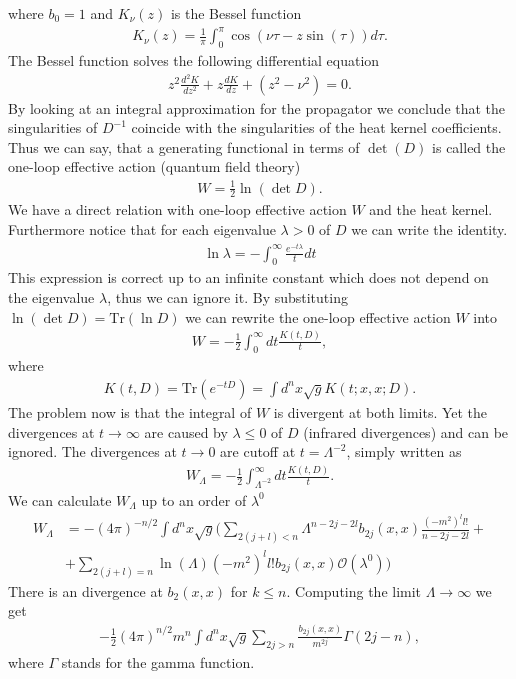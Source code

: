 where $b_0 = 1$ and $K_\nu (z)$ is the Bessel function
\begin{align}
    K_\nu(z) = \frac{1}{\pi} \int_0^\pi \cos(\nu\tau-z\sin(\tau))d\tau.
\end{align}
The Bessel function solves the following differential equation
\begin{align}
    z^2 \frac{d^2K}{dz^2} + z \frac{dK}{dz} + (z^2 - \nu^2)=0.
\end{align}
By looking at an integral approximation for the propagator we conclude that
the singularities of $D^{-1}$ coincide with the singularities of the heat
kernel coefficients. Thus we can say, that a generating functional in terms of
$\det(D)$ is called the one-loop effective action (quantum field theory)
\begin{align}
    W = \frac{1}{2}\ln(\det D).
\end{align}
We have a direct relation with one-loop effective action $W$ and the
heat kernel. Furthermore notice that for each eigenvalue $\lambda >0$ of $D$
we can write the identity.
\begin{align}
    \ln \lambda  = -\int_0^\infty \frac{e^{-t\lambda}}{t}dt
\end{align}
This expression is correct up to an infinite constant which does not depend
on the eigenvalue $\lambda$, thus we can ignore it. By substituting
$\ln(\det D) = \text{Tr}(\ln D)$ we can rewrite the one-loop effective action
$W$ into
\begin{align}
    W = -\frac{1}{2} \int_0^\infty dt \frac{K(t, D)}{t},
\end{align}
where
\begin{align}
    K(t, D) = \text{Tr}(e^{-tD}) = \int d^n x \sqrt{g}K(t;x,x;D).
\end{align}
The problem now is that the integral of $W$ is divergent at both limits. Yet
the divergences at $t\rightarrow \infty$ are caused by $\lambda \leq 0$ of $D$
(infrared divergences) and can be ignored. The divergences at $t\rightarrow 0$
are cutoff at $t=\Lambda^{-2}$, simply written as
\begin{align}
    W_\Lambda = -\frac{1}{2} \int_{\Lambda^{-2}}^\infty dt \frac{K(t, D)}{t}.
\end{align}
We can calculate $W_\Lambda$ up to an order of $\lambda ^0$
\begin{align}
    W_\Lambda &= -(4\pi)^{-n/2} \int d^n x\sqrt{g}\bigg(
    \sum_{2(j+l)<n}\Lambda^{n-2j-2l}b_{2j}(x,x) \frac{(-m^2)^l l!}{n-2j-2l} +\\
    &+ \sum_{2(j+l) =n }\ln(\Lambda) (-m^2)^l l! b_{2j}(x,x)
    \mathcal{O}(\lambda^0) \bigg)
\end{align}
There is an divergence at $b_2(x,x)$ for $k\leq n$. Computing the limit
$\Lambda \rightarrow \infty$ we get
\begin{align}
    -\frac{1}{2}(4\pi)^{n/2}m^n\int d^n x\sqrt{g} \sum_{2j>n}
    \frac{b_{2j}(x,x)}{m^{2j}}\Gamma(2j-n),
\end{align}
where $\Gamma$ stands for the gamma function.


